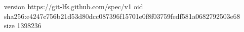 version https://git-lfs.github.com/spec/v1
oid sha256:e4247c756b21d53d80dcc087396f15701e0f8f03759fedf581a0682792503e68
size 1398236
